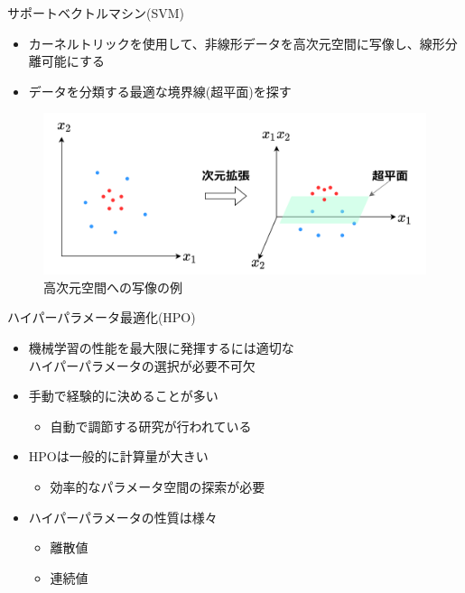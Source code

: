 \documentclass[12pt, cjk, dvipdfmx]{beamer}
\begin{document}
\begin{frame}
\begin{columns}[t]
\begin{column}{0.490\linewidth}
\begin{mybox}{サポートベクトルマシン(SVM)}
\begin{itemize}
        
                  \item カーネルトリックを使用して、非線形データを高次元空間に写像し、線形分離可能にする 
                  \item データを分類する最適な境界線(超平面)を探す                
                \end{itemize}
                \begin{figure}
                  \centering
                  \includegraphics[width=0.9\linewidth]{syazou.png}
                  \caption{高次元空間への写像の例}
                 \end{figure}
            \end{mybox}
            \begin{mybox}{ハイパーパラメータ最適化(HPO)}
              \begin{itemize}
                \item 機械学習の性能を最大限に発揮するには適切な\\ハイパーパラメータの選択が必要不可欠
                \item 手動で経験的に決めることが多い
                 \begin{itemize}
                   \item 自動で調節する研究が行われている
                 \end{itemize}
                \item HPOは一般的に計算量が大きい
                \begin{itemize}
                  \item 効率的なパラメータ空間の探索が必要
                \end{itemize}
                \item ハイパーパラメータの性質は様々
                \begin{itemize}
                  \item 離散値
                  \item 連続値

\end{itemize}
\end{itemize}
\end{mybox}
\end{column}
\end{columns}
\end{frame}
\end{document}
